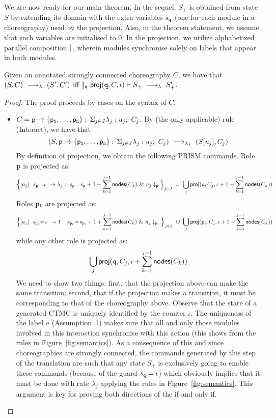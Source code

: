 We are now ready for our main theorem. In the sequel, $S_+$ is
obtained from state $S$ by extending its domain with the extra
variables $s_{\mathtt{q}}$ (one for each module in a choreography) used
by the projection. Also, in the theorem statement, we assume that such
variables are initialised to $0$. In the projection, we utilize
alphabetized parallel composition $|\!|$, wherein modules synchronise
solely on labels that appear in both modules.
%
\begin{theorem}[Projection]\label{thm:epp}
  Given an annotated strongly connected choreography $C$, we have that
  $(S,C) \ \longrightarrow_{\lambda}\  (S', C')$ iff
  $|\!|_{\mathtt{q}}\ \mathsf{proj} (\mathtt{q}, C,\iota)\vdash S_{+} \ \longrightarrow_{\lambda}\ 
  S_{+}'$.
\end{theorem}
\begin{proof}
  The proof proceeds by cases on the syntax of $C$.
  \begin{itemize}
  \item $C=\mathtt{p}\rightarrow \{\mathtt{\mathtt{p}_1,\ldots,\mathtt{p}_n}\}:\,\Sigma_{j\in J}\lambda_j: u_j;\ C_j$.  By (the only
    applicable) rule \textsf{(Interact)}, we have that
    \[
      (S, \mathtt{p}\rightarrow \{\mathtt{\mathtt{p}_1,\ldots,\mathtt{p}_n}\}:\,\Sigma_{j\in J}\lambda_j: u_j;\ C_j)
      \ \longrightarrow_{\lambda_j}\  (S[u_j], C_j) 
    \]
    By definition of projection, we obtain the following PRISM
    commands. Role $\mathtt{p}$ is projected as:
    \[
      \Big\{\commandBase {a_j} {\ s_{\role p}\!=\! \iota} {\lambda_j:\ s_{\role p}\!=\!
        s_{\role p} +1+\sum_{k=1}^{j-1}\mathsf{nodes}({C_k})}\ \&\ \projE
      {u_j}{\role p}\Big\}_{j\in J}
      \ \cup\ \bigcup_{j} \proj (\role q, C_j,
      \iota+1+\sum_{k=1}^{j-1}\mathsf{nodes}({C_k}))
    \]
    Roles $\mathtt{p_i}$ are projected as:
    \[
      \Big\{\commandBase {a_j} {\ s_{\role p_i}\!=\! \iota} {1:\ s_{\role p_i}\!=\!
        s_{\role p_i} +1+\sum_{k=1}^{j-1}\mathsf{nodes}({C_k})}\ \&\ 
       \projE{u_j}{\role p_i}\Big\}_{j\in J}
      \ \cup\ \bigcup_{j} \proj (\role p_i, C_j, \iota+1+\sum_{k=1}^{j-1}\mathsf{nodes}({C_k}))
    \]
    while any other role is projected as: 
    \[\bigcup_{j} \mathsf{proj} (\mathtt{q}, C_j, \iota+\sum_{k=1}^{j-1}\mathsf{nodes}({C_k}))
    \]
    We need to show two things: first, that the projection above can
    make the same transition; second, that if the projection makes a
    transition, it must be corresponding to that of the choreography
    above.
    Observe that the state of a generated CTMC is uniquely identified
    by the counter $\iota$.  The uniqueness of the label $a$
    (Assumption~1) makes sure that all and only those modules involved
    in this interaction synchronise with this action (this shows from
    the rules in Figure~\ref{fig:semantics}).  As a consequence of
    this and since choreographies are strongly connected, the commands
    generated by this step of the translation are such that any state
    $S_+$ is exclusively going to enable these commands (because of
    the guard $s_{\mathtt{q}}=\iota$) which obviously implies that it
    must be done with rate $\lambda_j$ applying the rules in
    Figure~\ref{fig:semantics}. This argument is key for proving both
    directions of the if and only if.


\end{itemize}
\end{proof}
